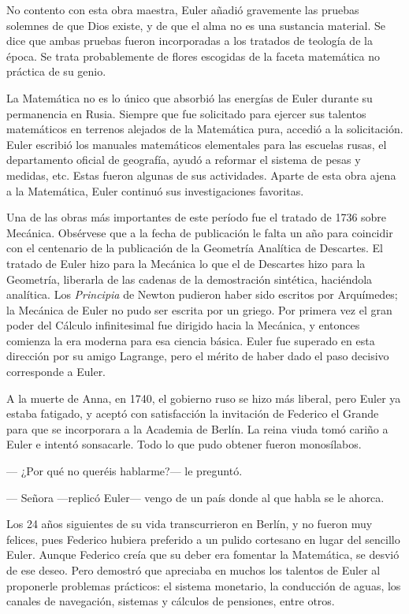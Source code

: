 \documentclass[a4paper, 12pt]{article}
\begin{document}
No contento con esta obra maestra, Euler añadió gravemente las pruebas solemnes de que Dios existe, y de que el alma no es una sustancia material. Se dice que ambas pruebas fueron incorporadas a los tratados de teología de la época. Se trata probablemente de flores escogidas de la faceta matemática no práctica de su genio.

La Matemática no es lo único que absorbió las energías de Euler durante su permanencia en Rusia. Siempre que fue solicitado para ejercer sus talentos matemáticos en terrenos alejados de la Matemática pura, accedió a la solicitación. Euler escribió los manuales matemáticos elementales para las escuelas rusas, el departamento oficial de geografía, ayudó a reformar el sistema de pesas y medidas, etc. Estas fueron algunas de sus actividades. Aparte de esta obra ajena a la Matemática, Euler continuó sus investigaciones favoritas.

Una de las obras más importantes de este período fue el tratado de 1736 sobre Mecánica. Obsérvese que a la fecha de publicación le falta un año para coincidir con el centenario de la publicación de la Geometría Analítica de Descartes. El tratado de Euler hizo para la Mecánica lo que el de Descartes hizo para la Geometría, liberarla de las cadenas de la demostración sintética, haciéndola analítica. Los {\it Principia} de Newton pudieron haber sido escritos por Arquímedes; la Mecánica de Euler no pudo ser escrita por un griego. Por primera vez el gran poder del Cálculo infinitesimal fue dirigido hacia la Mecánica, y entonces comienza la era moderna para esa ciencia básica. Euler fue superado en esta dirección por su amigo Lagrange, pero el mérito de haber dado el paso decisivo corresponde a Euler.

A la muerte de Anna, en 1740, el gobierno ruso se hizo más liberal, pero Euler ya estaba fatigado, y aceptó con satisfacción la invitación de Federico el Grande para que se incorporara a la Academia de Berlín. La reina viuda tomó cariño a Euler e intentó sonsacarle. Todo lo que pudo obtener fueron monosílabos.

\noindent --- ¿Por qué no queréis hablarme?--- le preguntó.

\noindent --- Señora ---replicó Euler--- vengo de un país donde al que habla se le ahorca.

Los 24 años siguientes de su vida transcurrieron en Berlín, y no fueron muy felices, pues Federico hubiera preferido a un pulido cortesano en lugar del sencillo Euler. Aunque Federico creía que su deber era fomentar la Matemática, se desvió de ese deseo. Pero demostró que apreciaba en muchos los talentos de Euler al proponerle problemas prácticos: el sistema monetario, la conducción de aguas, los canales de navegación, sistemas y cálculos de pensiones, entre otros.
\end{document}

